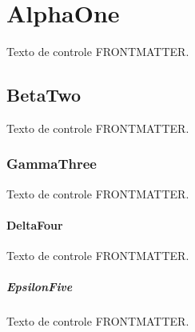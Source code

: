 \documentclass{abntexto-ufc}
\begin{document}
\pretextual

\ufcPrintTableOfContents

\textual

\section{AlphaOne}
Texto de controle FRONTMATTER.

\subsection{BetaTwo}
Texto de controle FRONTMATTER.

\subsubsection{GammaThree}
Texto de controle FRONTMATTER.

\paragraph{DeltaFour}
Texto de controle FRONTMATTER.

\subparagraph{EpsilonFive}
Texto de controle FRONTMATTER.
\end{document}
